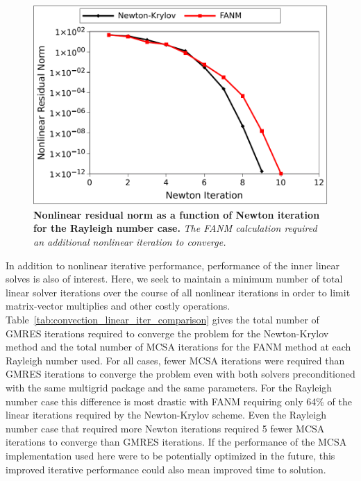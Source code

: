 \begin{figure}[htpb!]
  \begin{center}
    \includegraphics[width=6in]{chapters/nonlinear_problem/ra_1e5_convergence.pdf}
  \end{center}
  \caption{\textbf{Nonlinear residual norm as a function of Newton
      iteration for the  Rayleigh number case.} \textit{The
      FANM calculation required an additional nonlinear iteration to
      converge.}}
  \label{fig:ra1e5_convergence}
\end{figure}

In addition to nonlinear iterative performance, performance of the
inner linear solves is also of interest. Here, we seek to maintain a
minimum number of total linear solver iterations over the course of
all nonlinear iterations in order to limit matrix-vector multiplies
and other costly
operations. Table~\ref{tab:convection_linear_iter_comparison} gives
the total number of GMRES iterations required to converge the problem
for the Newton-Krylov method and the total number of MCSA iterations
for the FANM method at each Rayleigh number used. For all cases, fewer
MCSA iterations were required than GMRES iterations to converge the
problem even with both solvers preconditioned with the same multigrid
package and the same parameters. For the  Rayleigh number
case this difference is most drastic with FANM requiring only 64\% of
the linear iterations required by the Newton-Krylov scheme. Even the
 Rayleigh number case that required more Newton iterations
required 5 fewer MCSA iterations to converge than GMRES
iterations. If the performance of the MCSA implementation used here
were to be potentially optimized in the future, this improved
iterative performance could also mean improved time to solution.

